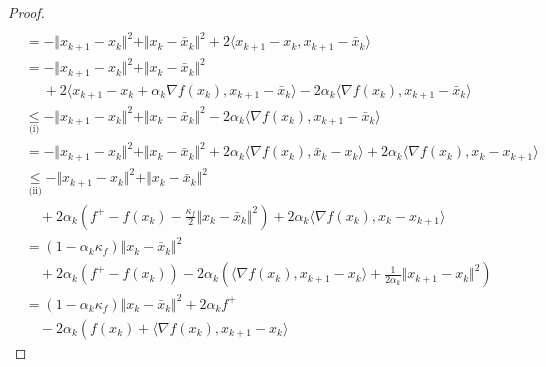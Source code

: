 \documentclass[12pt]{report}
\begin{document}
\begin{proof}
{\begin{align*}
                    \\
                    &= - \Vert x_{k + 1} - x_k\Vert^2 + \Vert x_k - \bar x_k\Vert^2
                    + 2 \langle x_{k + 1} - x_{k}, x_{k + 1} - \bar x_k\rangle
                    \\
                    &= 
                    - \Vert x_{k + 1} - x_k\Vert^2 + \Vert x_k - \bar x_k\Vert^2
                    \\  & \quad \;
                        + 2 \langle x_{k + 1} - x_{k} + \alpha_k \nabla f(x_k), x_{k + 1} - \bar x_k\rangle
                        - 2\alpha_k \langle \nabla f(x_k), x_{k + 1} - \bar x_k\rangle
                    \\
                    &\underset{\text{(i)}}{\le}
                    - \Vert x_{k + 1} - x_k\Vert^2 + \Vert x_k - \bar x_k\Vert^2
                    - 2\alpha_k \langle \nabla f(x_k), x_{k + 1} - \bar x_k\rangle
                    \\
                    &= 
                    - \Vert x_{k + 1} - x_k\Vert^2 + \Vert x_k - \bar x_k\Vert^2
                    + 2\alpha_k \langle \nabla f(x_k), \bar x_k - x_k\rangle
                    + 2\alpha_k \langle \nabla f(x_k), x_k - x_{k + 1}\rangle
                    \\
                    &\underset{\text{(ii)}}{\le}
                    - \Vert x_{k + 1} - x_k\Vert^2 + \Vert x_k - \bar x_k\Vert^2
                    \\ &\quad 
                        + 2\alpha_k \left(
                            f^+ - f(x_k) - \frac{\kappa_f}{2}\Vert x_k - \bar x_k\Vert^2
                        \right)
                        + 2\alpha_k \langle \nabla f(x_k), x_k - x_{k + 1}\rangle
                    \\
                    &= (1 - \alpha_k \kappa_f)\Vert x_k - \bar x_k\Vert^2
                    \\&\quad 
                        + 2\alpha_k(f^+ - f(x_k)) - 2\alpha_k 
                        \left(
                            \langle \nabla f(x_k), x_{k + 1} - x_k\rangle + \frac{1}{2\alpha_k}\Vert x_{k + 1} - x_k\Vert^2
                        \right)
                    \\
                    &= 
                    (1 - \alpha_k\kappa_f)\Vert x_k - \bar x_k\Vert^2 + 2 \alpha_k f^+
                    \\&\quad 
                        - 2 \alpha_k\left(
                            f(x_k) + \langle \nabla f(x_k), x_{k + 1} - x_k\rangle 

\end{align*}}
\end{proof}
\end{document}
